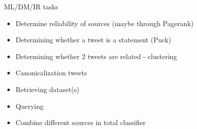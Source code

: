 ML/DM/IR tasks


\begin{itemize}
    \item Determine reliability of sources (maybe through Pagerank)
    \item Determining whether a tweet is a statement (Puck)
    \item Determining whether 2 tweets are related - clustering
    \item Canonicalization tweets
    \item Retrieving dataset(s)
    \item Querying
    \item Combine different sources in total classifier
\end{itemize}